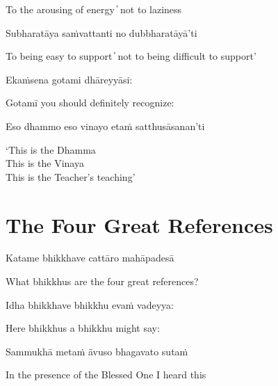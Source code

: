 \begin{cprenglish}
  To the arousing of energy  ̓  not to laziness
\end{cprenglish}

Subharatāya saṁvattanti no dubbharatāyā’ti

\begin{cprenglish}
  To being easy to support  ̓  not to being difficult to support’
\end{cprenglish}

Ekaṁsena gotami dhāreyyāsi:

\begin{cprenglish}
  Gotamī you should definitely recognize:
\end{cprenglish}

Eso dhammo eso vinayo etaṁ satthusāsanan’ti

\begin{cprenglish}
  ‘This is the Dhamma\\
  This is the Vinaya\\
  This is the Teacher’s teaching’
\end{cprenglish}

\suttaRef{[AN 8.53]}

\clearpage

\section{The Four Great References}

\begin{leader}
\end{leader}

Katame bhikkhave cattāro mahāpadesā

\begin{cprenglish}
  What bhikkhus are the four great references?
\end{cprenglish}

Idha bhikkhave bhikkhu evaṁ vadeyya:

\begin{cprenglish}
  Here bhikkhus a bhikkhu might say:
\end{cprenglish}

Sammukhā metaṁ āvuso bhagavato sutaṁ

\begin{cprenglish}
  In the presence of the Blessed One I heard this
\end{cprenglish}

